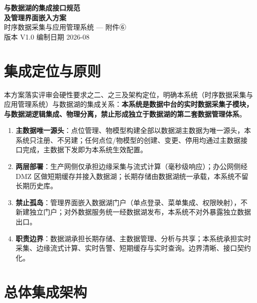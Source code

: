 \documentclass[11pt,a4paper]{ctexart}
\begin{document}
\begin{center}
{\Huge\bfseries 与数据湖的集成接口规范\\[8pt] 及管理界面嵌入方案}\\[14pt]
{\large 时序数据采集与应用管理系统 — 附件⑥}\\[8pt]
{\large 版本 V1.0 \quad 编制日期 2026-08}
\end{center}

\vspace{1em}
\noindent\hrulefill
\vspace{1em}

\section{集成定位与原则}

本方案落实评审会硬性要求之二、之三及架构定位，明确本系统（时序数据采集与应用管理系统）与数据湖的集成关系：\textbf{本系统是数据中台的实时数据采集子模块，与数据湖逻辑集成、物理分离，禁止形成独立于数据湖的第二套数据管理体系}。

\begin{enumerate}[leftmargin=*]
  \item \textbf{主数据唯一源头}：点位管理、物模型构建全部以数据湖主数据为唯一源头，本系统只注册、不另建；任何点位/物模型的创建、变更、停用均通过主数据接口完成，主数据下发即为本系统生效配置。
  \item \textbf{两层部署}：生产网侧仅承担边缘采集与流式计算（毫秒级响应）；办公网侧经 DMZ 区做短期缓存并接入数据湖；长期存储由数据湖统一承载，本系统不留长期历史库。
  \item \textbf{禁止孤岛}：管理界面嵌入数据湖门户（单点登录、菜单集成、权限映射），不新建独立门户；对外数据服务统一经数据湖发布，本系统不对外暴露独立数据出口。
  \item \textbf{职责边界}：数据湖承担长期存储、主数据管理、分析与共享；本系统承担实时采集、边缘流式计算、实时告警、短期缓存与实时查询。边界清晰、接口契约化。
\end{enumerate}

\section{总体集成架构}
\end{document}
